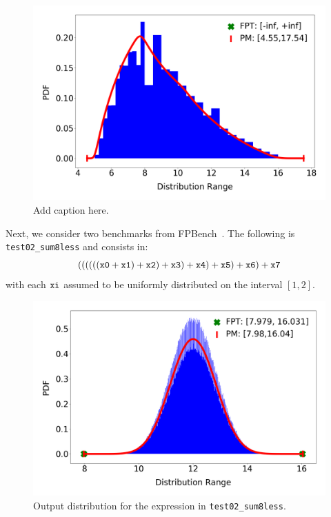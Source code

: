\documentclass[10pt,conference]{IEEEtran}
\begin{document}
\begin{figure}[h!]
\includegraphics[scale=0.22]{pics/range_dist_div}
\caption{Add caption here.}
\label{fig:impl:div}
\end{figure}

Next, we consider two benchmarks from FPBench~\cite{fpbench}. The following is \texttt{test02\_sum8less} and consists in: 
\[
\tt{((((((x0 + x1) + x2) + x3) + x4) + x5) + x6) + x7}
\]
with each $\tt xi$ assumed to be uniformly distributed on the interval $\left[1,2\right]$. 

\begin{figure}[h!]
	\includegraphics[scale=0.22]{pics/range_dist}
	\caption{Output distribution for the expression in \texttt{test02\_sum8less}.}
	\label{fig:impl:benchmark}
\end{figure}
\end{document}
